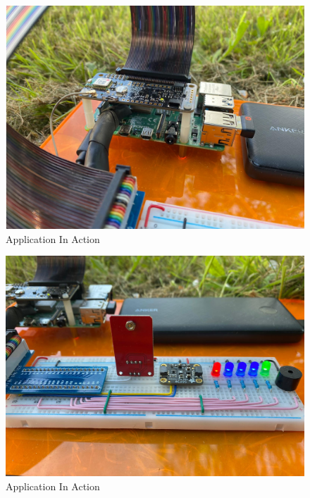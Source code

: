 \documentclass{ueacmpstyle}
\begin{document}
            \begin{figure}[h]
                \centering
                \includegraphics[width=\linewidth]{Images/berry.png}
                \caption{Application In Action}
                \label{Figure App In Action}
            
            \end{figure}
            \clearpage
            \begin{figure}[h]
                \centering
                \includegraphics[width=\linewidth]{Images/bread.png}
                \caption{Application In Action}
                \label{Figure App In Action}
            
            \end{figure}
\end{document}
